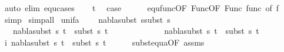 \begin{isabellebody}
\ {\isacharparenleft}{\kern0pt}auto\ elim{\isacharcolon}{\kern0pt}\ equ{\isachardot}{\kern0pt}cases{\isacharparenright}{\kern0pt}\isanewline
\ \ \isamarkupfalse%
\ t{}\ \isamarkupfalse%
\ {\isacharquery}{\kern0pt}case\isanewline
\ \ \ \ \isamarkupfalse%
\ equ{\isacharunderscore}{\kern0pt}func{\isacharbrackleft}{\kern0pt}OF\ Func{\isacharparenleft}{\kern0pt}{}{\isacharparenright}{\kern0pt}{\isacharbrackleft}{\kern0pt}OF\ Func{\isacharparenleft}{\kern0pt}{}{\isacharparenright}{\kern0pt}\ func{\isacharbrackright}{\kern0pt}{\isacharcomma}{\kern0pt}\ of\ f{\isacharbrackright}{\kern0pt}\ \isamarkupfalse%
\ simp\isanewline
{}\isamarkupfalse%
\ {\isacharparenleft}{\kern0pt}simp{\isacharunderscore}{\kern0pt}all{\isacharparenright}{\kern0pt}%
\endisatagproof
{\isafoldproof}%
%
\isadelimproof
\isanewline
%
\endisadelimproof
\isanewline
{}\isamarkupfalse%
\ unif{\isacharunderscore}{\kern0pt}{}a{\isacharcolon}{\kern0pt}\ \isanewline
\ \ \ {\isachardoublequoteopen}nabla{\isasymTurnstile}subst\ s{}{\isasymapprox}subst\ s{}{\isachardoublequoteclose}\isanewline
\ \ \ {\isachardoublequoteopen}{\isacharparenleft}{\kern0pt}nabla{\isasymturnstile}subst\ s{}\ t{}\ {\isasymapprox}\ subst\ s{}\ t{}{\isacharparenright}{\kern0pt}{\isachardoublequoteclose}\ \ \ \ \ \ \ \ \ \ \ \ \ \isanewline
{}nabla{\isasymturnstile}subst\ s{}\ t{}\ {\isasymapprox}\ subst\ s{}\ t{}{\isacharparenright}{\kern0pt}{\isachardoublequoteclose}\isanewline
%
\isadelimproof
%
\endisadelimproof
%
\isatagproof
{}\isamarkupfalse%
{\isacharminus}{\kern0pt}\isanewline
\ \ \isamarkupfalse%
\ i{\isacharcolon}{\kern0pt}\ {\isachardoublequoteopen}{\isacharparenleft}{\kern0pt}nabla{\isasymturnstile}subst\ s{}\ t{}\ {\isasymapprox}\ subst\ s{}\ t{}{\isacharparenright}{\kern0pt}{\isachardoublequoteclose}\isanewline
\ \ \ \ \isamarkupfalse%
\ subst{\isacharunderscore}{\kern0pt}equ{\isacharunderscore}{\kern0pt}a{\isacharbrackleft}{\kern0pt}OF\ assms{\isacharparenleft}{\kern0pt}{}{\isacharcomma}{\kern0pt}{}{\isacharparenright}{\kern0pt}{\isacharbrackright}{\kern0pt}\ \isamarkupfalse%

\end{isabellebody}

